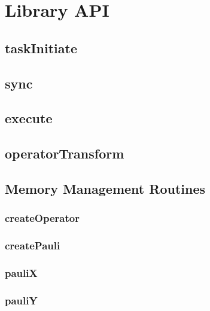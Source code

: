 \documentclass[10pt]{book}
\begin{document}
\section{\qcor Library API}\label{sec:qcor_library_api}
\subsection{\textbf{taskInitiate}}\label{subsec:taskInitiate}


\subsection{\textbf{sync}}\label{subsec:sync}


\subsection{\textbf{execute}}\label{subsec:execute}


\subsection{\textbf{operatorTransform}}\label{subsec:operatortransform}



\subsection{Memory Management Routines}
\subsubsection{\textbf{createOperator}}\label{subsec:createop}


\subsubsection{\textbf{createPauli}}\label{subsec:createpauli}


\subsubsection{\textbf{pauliX}}\label{subsec:paulix}


\subsubsection{\textbf{pauliY}}\label{subsec:pauliy}

\end{document}
